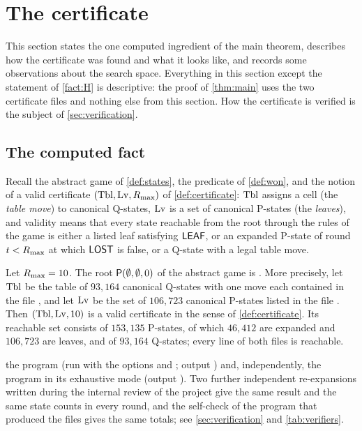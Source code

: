 \section{The certificate}\label{sec:certificate}


This section states the one computed ingredient of the main theorem, describes how the certificate was
found and what it looks like, and records some observations about the search space. Everything in this
section except the statement of \cref{fact:H} is descriptive: the proof of \cref{thm:main}
uses the two certificate files and nothing else from this section. How the certificate is verified is the
subject of \cref{sec:verification}.

\subsection{The computed fact}\label{ssec:fact}

Recall the abstract game of \cref{def:states}, the predicate \WON{} of \cref{def:won}, and the notion of a
valid certificate $(\mathrm{Tbl},\mathrm{Lv},R_{\max})$ of \cref{def:certificate}: $\mathrm{Tbl}$ assigns a cell (the \emph{table move})
to canonical Q-states, $\mathrm{Lv}$ is a set of canonical P-states (the \emph{leaves}), and validity means that every
state reachable from the root through the rules of the game is either a listed leaf satisfying
$\mathsf{LEAF}$, or an expanded P-state of round $t<R_{\max}$ at which $\mathsf{LOST}$ is false, or a Q-state with a legal table
move.

\begin{fact}\label{fact:H}
Let $R_{\max}=10$. The root $\mathsf{P}(\emptyset,\emptyset,0)$ of the abstract game is \WON. More precisely, let
$\mathrm{Tbl}$ be the table of $93{,}164$ canonical Q-states with one move each contained in the file
, and let $\mathrm{Lv}$ be the set of $106{,}723$ canonical P-states listed in the file
. Then $(\mathrm{Tbl},\mathrm{Lv},10)$ is a valid certificate in the sense of
\cref{def:certificate}. Its reachable set consists of $153{,}135$ P-states, of which $46{,}412$ are expanded
and $106{,}723$ are leaves, and of $93{,}164$ Q-states; every line of both files is reachable.

\established the program  (run with the options  and
; output ) and, independently, the program
 in its exhaustive mode (output ). Two further
independent re-expansions written during the internal review of the project give the same result and the
same state counts in every round, and the self-check of the program that produced the files gives the same
totals; see \cref{sec:verification} and \cref{tab:verifiers}.
\end{fact}

